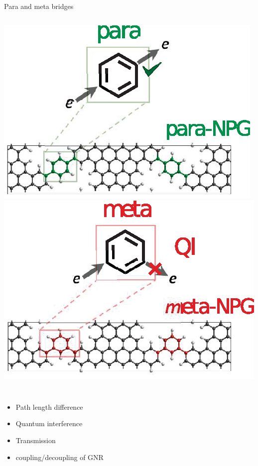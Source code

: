 \documentclass[hyperref={colorlinks=true,urlcolor=blue,linkcolor=.},aspectratio=1610,mathserif]{beamer}
\begin{document}
\begin{frame}{Para and meta bridges}
	\centering
	\begin{overprint}
		\centering
		\begin{columns}[t]
			\includegraphics[height=.7\textwidth]{Figures/Parametagraphic.eps}
			\includegraphics[height=.7\textwidth]{Figures/Metaparagraphic.eps}
		\end{columns}
		\begin{columns}[c]
			\begin{itemize}
				\item Path length difference
				\item Quantum interference
				\item Transmission
				\item coupling/decoupling of GNR

\end{itemize}
\end{columns}
\end{overprint}
\end{frame}
\end{document}
